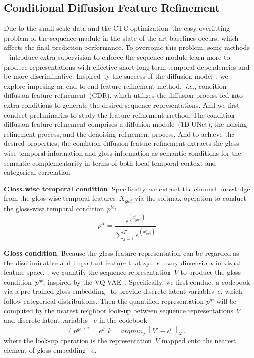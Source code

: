 \documentclass[sigconf]{acmart}
\begin{document}
\subsection{Conditional Diffusion Feature Refinement}
\label{sec_cdr}


Due to the small-scale data and the CTC optimization, the easy-overfitting problem of the sequence module in the state-of-the-art baselines occurs, which affects the final prediction performance. 
To overcome this problem, some methods ~\cite{pu2019iterative, pu2020boosting, cheng2020fully, min2021visual,hao2021self, zuo2022c2slr} introduce extra supervision to enforce the sequence module learn more to produce representations with effective short-long-term temporal dependencies and be more discriminative.
Inspired by the success of the diffusion model~\cite{2022imagen,Ramesh2022HierarchicalTI,2022StableDiffusion,Ho2022VideoDM,Ho2022ImagenVH,Ruan2022MMDiffusionLM,He2022DiffusionBERTIG,Le2023MaskDiffMM,han2022card}, we explore imposing an end-to-end feature refinement method,~\textit{i.e.}, condition diffusion feature refinement~(CDR), which utilizes the diffusion process fed into extra conditions to generate the desired sequence representations. 
And we first conduct preliminaries to study the feature refinement method. 
The condition diffusion feature refinement comprises a diffusion module~(1D-UNet), the noising refinement process, and the denoising refinement process.
And to achieve the desired properties, the condition diffusion feature refinement extracts the gloss-wise temporal information and gloss information as semantic conditions for the semantic complementarity in terms of both local temporal context and categorical correlation.



\noindent \textbf{Gloss-wise temporal condition}. Specifically, we extract the channel knowledge from the gloss-wise temporal features~$X_{gwt}$ via the softmax operation to conduct the gloss-wise temporal condition~$p^{tc}$:
\begin{equation}
    p^{tc} = \frac{{{e^{{{(x^i_{gwt})}}}}}}{{\sum\nolimits_{j = 1}^T {{e^{{{(x^j_{gwt})}}}}} }}
\end{equation}


\noindent \textbf{Gloss condition}.
Because the gloss feature representation can be regarded as the discriminative and important feature that spans many dimensions in visual feature space. 
, we quantify the sequence representation~$V$ to produce the gloss condition~$p^{gc}$, inspired by the VQ-VAE~\cite{VQVAE2017}. 
Specifically, we first conduct a codebook via a pre-trained gloss embedding~\cite{chen2022two} to provide discrete latent variables~$e$, which follow categorical distributions. 
Then the quantified representation $p^{gc}$ will be computed by the nearest neighbor look-up between  sequence representations~$V$ and discrete latent variables ~$e$ in the codebook.
\begin{equation}
    (p^{gc})^i = {e^k}, k = argmin_{j}{\left\| {{V^i} - {e^i}} \right\|_2}\ ,
\end{equation}
where the look-up operation is the representation~$V$  mapped onto the nearest element of gloss embedding ~$e$.
\end{document}
